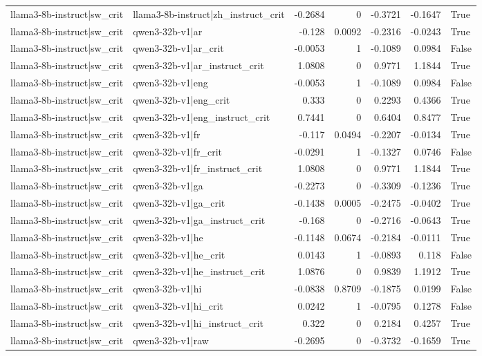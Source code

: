 \begin{table}
\begin{tabular}{l l r r r r l}
llama3-8b-instruct|sw_crit & llama3-8b-instruct|zh_instruct_crit & -0.2684 & 0 & -0.3721 & -0.1647 & True \\
llama3-8b-instruct|sw_crit & qwen3-32b-v1|ar & -0.128 & 0.0092 & -0.2316 & -0.0243 & True \\
llama3-8b-instruct|sw_crit & qwen3-32b-v1|ar_crit & -0.0053 & 1 & -0.1089 & 0.0984 & False \\
llama3-8b-instruct|sw_crit & qwen3-32b-v1|ar_instruct_crit & 1.0808 & 0 & 0.9771 & 1.1844 & True \\
llama3-8b-instruct|sw_crit & qwen3-32b-v1|eng & -0.0053 & 1 & -0.1089 & 0.0984 & False \\
llama3-8b-instruct|sw_crit & qwen3-32b-v1|eng_crit & 0.333 & 0 & 0.2293 & 0.4366 & True \\
llama3-8b-instruct|sw_crit & qwen3-32b-v1|eng_instruct_crit & 0.7441 & 0 & 0.6404 & 0.8477 & True \\
llama3-8b-instruct|sw_crit & qwen3-32b-v1|fr & -0.117 & 0.0494 & -0.2207 & -0.0134 & True \\
llama3-8b-instruct|sw_crit & qwen3-32b-v1|fr_crit & -0.0291 & 1 & -0.1327 & 0.0746 & False \\
llama3-8b-instruct|sw_crit & qwen3-32b-v1|fr_instruct_crit & 1.0808 & 0 & 0.9771 & 1.1844 & True \\
llama3-8b-instruct|sw_crit & qwen3-32b-v1|ga & -0.2273 & 0 & -0.3309 & -0.1236 & True \\
llama3-8b-instruct|sw_crit & qwen3-32b-v1|ga_crit & -0.1438 & 0.0005 & -0.2475 & -0.0402 & True \\
llama3-8b-instruct|sw_crit & qwen3-32b-v1|ga_instruct_crit & -0.168 & 0 & -0.2716 & -0.0643 & True \\
llama3-8b-instruct|sw_crit & qwen3-32b-v1|he & -0.1148 & 0.0674 & -0.2184 & -0.0111 & True \\
llama3-8b-instruct|sw_crit & qwen3-32b-v1|he_crit & 0.0143 & 1 & -0.0893 & 0.118 & False \\
llama3-8b-instruct|sw_crit & qwen3-32b-v1|he_instruct_crit & 1.0876 & 0 & 0.9839 & 1.1912 & True \\
llama3-8b-instruct|sw_crit & qwen3-32b-v1|hi & -0.0838 & 0.8709 & -0.1875 & 0.0199 & False \\
llama3-8b-instruct|sw_crit & qwen3-32b-v1|hi_crit & 0.0242 & 1 & -0.0795 & 0.1278 & False \\
llama3-8b-instruct|sw_crit & qwen3-32b-v1|hi_instruct_crit & 0.322 & 0 & 0.2184 & 0.4257 & True \\
llama3-8b-instruct|sw_crit & qwen3-32b-v1|raw & -0.2695 & 0 & -0.3732 & -0.1659 & True \\

\end{tabular}
\end{table}
